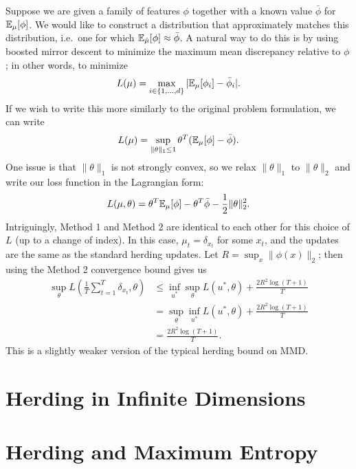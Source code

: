\documentclass{article}
\begin{document}
Suppose we are given a family of features $\phi$ together 
with a known value $\bar{\phi}$ for $\mathbb{E}_{\mu}[\phi]$. We 
would like to construct a distribution that approximately 
matches this distribution, i.e.~one for which 
$\mathbb{E}_{\hat{\mu}}[\phi] \approx \bar{\phi}$. A natural way 
to do this is by using boosted mirror descent to minimize the 
maximum mean discrepancy relative to $\phi$; 
in other words, to minimize
\[ L(\mu) = \max_{i \in \{1,\dots,d\}} |\mathbb{E}_{\mu}[\phi_i]-\bar{\phi}_i|. \]
If we wish to write this more similarly to the original problem 
formulation, we can write
\[ L(\mu) = \sup_{\|\theta\|_1 \leq 1} \theta^T(\mathbb{E}_{\mu}[\phi]-\bar{\phi}). \]
One issue is that $\|\theta\|_1$ is not strongly convex, so we relax $\|\theta\|_1$ 
to $\|\theta\|_2$ and write our loss function in the Lagrangian form:
\[ L(\mu, \theta) = \theta^T\mathbb{E}_{\mu}[\phi] - \theta^T\bar{\phi} - \frac{1}{2}\|\theta\|_2^2. \]
Intriguingly, Method 1 and Method 2 are identical to each other for this choice of $L$ 
(up to a change of index). In this case, $\mu_t = \delta_{x_t}$ for some $x_t$, and 
the updates are the same as the standard herding updates. Let $R = \sup_{x} \|\phi(x)\|_2$; 
then using the Method 2 convergence bound gives us
\begin{align*}
\sup_{\theta} L\left(\frac{1}{T} \sum_{t=1}^T \delta_{x_t}, \theta\right) &\leq \inf_{u^*} \sup_{\theta} L(u^*, \theta) + \frac{2R^2\log(T+1)}{T} \\
 &= \sup_{\theta} \inf_{u^*} L(u^*, \theta) + \frac{2R^2\log(T+1)}{T} \\
 &= \frac{2R^2\log(T+1)}{T}.
\end{align*}
This is a slightly weaker version of the typical herding bound on MMD.

\section{Herding in Infinite Dimensions}
\label{sec:infinite-case}

\section{Herding and Maximum Entropy}
\label{sec:max-ent}
\end{document}
